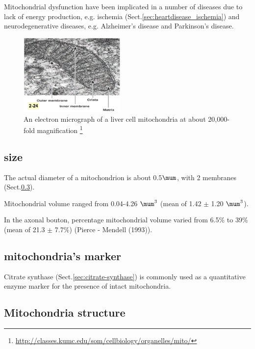 Mitochondrial dysfunction have been implicated in a number of diseases due to
lack of energy production, e.g. ischemia (Sect.\ref{sec:heartdisease_ischemia})
and neurodegenerative diseases, e.g. Alzheimer's disease and Parkinson's
disease.

\begin{figure}[hbt]
  \centerline{\includegraphics[height=4cm,
    angle=0]{./images/mitochondria_electronmicrograph.eps}}
\caption{An electron micrograph of a liver cell mitochondria at about
20,000-fold magnification
\footnote{\url{http://classes.kumc.edu/som/cellbiology/organelles/mito/}}}
\label{fig:mitochodnria_electronmicrograph}
\end{figure}

\subsection{size}
\label{sec:mitochondrion-size}

The actual diameter of a mitochondrion is about 0.5$\mum$, with 2 membranes
(Sect.\ref{sec:mitochondrion-structure}).

Mitochondrial volume ranged from 0.04-4.26 $\mum^3$ (mean of 1.42 $\pm$ 1.20
$\mum^3$).

In the axonal bouton, percentage mitochondrial volume varied from 6.5\% to 39\%
(mean of 21.3 $\pm$ 7.7\%) (Pierce - Mendell (1993)).

\subsection{mitochondria's marker}
\label{sec:mitochondria-marker}

Citrate synthase (Sect.\ref{sec:citrate-synthase}) is commonly used as a
quantitative enzyme marker for the presence of intact mitochondria.


\subsection{Mitochondria structure}
\label{sec:mitochondrion-structure}


